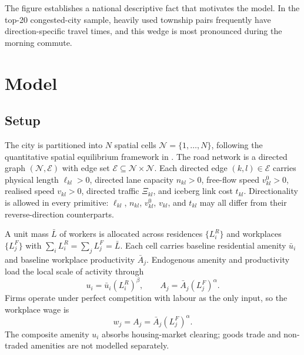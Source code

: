 \documentclass[12pt]{article}
\begin{document}
The figure establishes a national descriptive fact that motivates the model. In the top-20 congested-city sample, heavily used township pairs frequently have direction-specific travel times, and this wedge is most pronounced during the morning commute. 


\section{Model}
\label{sec:model}

\subsection{Setup}
\label{ssec:setup}

The city is partitioned into $N$ spatial cells $\mathcal{N} = \{1,\dots,N\}$, following the quantitative spatial equilibrium framework in \citet{AllenArkolakis2022}. The road network is a directed graph $(\mathcal{N},\mathcal{E})$ with edge set $\mathcal{E} \subseteq \mathcal{N} \times \mathcal{N}$. Each directed edge $(k,l) \in \mathcal{E}$ carries physical length $\ell_{kl} > 0$, directed lane capacity $n_{kl} > 0$, free-flow speed $v^{0}_{kl} > 0$, realised speed $v_{kl} > 0$, directed traffic $\Xi_{kl}$, and iceberg link cost $t_{kl}$. Directionality is allowed in every primitive: $\ell_{kl}$, $n_{kl}$, $v^{0}_{kl}$, $v_{kl}$, and $t_{kl}$ may all differ from their reverse-direction counterparts.

A unit mass $\bar{L}$ of workers is allocated across residences $\{L_i^R\}$ and workplaces $\{L_j^F\}$ with $\sum_i L_i^R = \sum_j L_j^F = \bar{L}$. Each cell carries baseline residential amenity $\bar{u}_i$ and baseline workplace productivity $\bar{A}_j$. Endogenous amenity and productivity load the local scale of activity through
\begin{equation}
  u_i = \bar{u}_i (L_i^R)^{\beta}, \qquad A_j = \bar{A}_j (L_j^F)^{\alpha}.
  \label{eq:fundamentals}
\end{equation}
Firms operate under perfect competition with labour as the only input, so the workplace wage is
\begin{equation}
  w_j = A_j = \bar{A}_j (L_j^F)^{\alpha}.
  \label{eq:wage}
\end{equation}
The composite amenity $u_i$ absorbs housing-market clearing; goods trade and non-traded amenities are not modelled separately.
\end{document}
